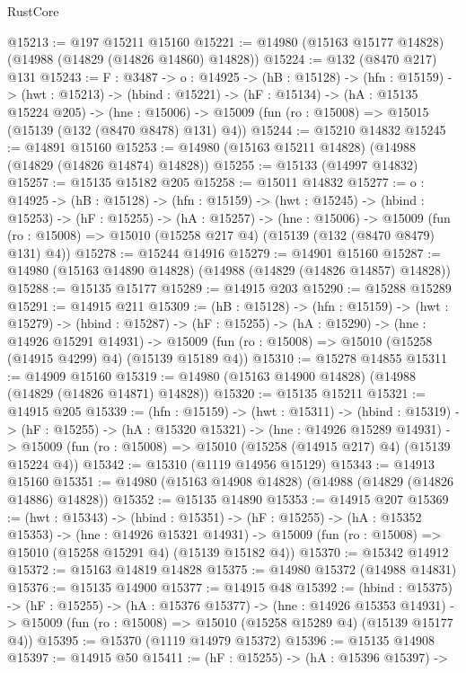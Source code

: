 \begin{lexlean}{RustCore}
\begin{coremodule}
@15213 := @197 @15211 @15160
@15221 := @14980 (@15163 @15177 @14828) (@14988 (@14829 (@14826 @14860) @14828))
@15224 := @132 (@8470 @217) @131
@15243 := {F : @3487} ->
  {o : @14925} ->
  (hB : @15128) ->
  (hfn : @15159) ->
  (hwt : @15213) ->
  (hbind : @15221) ->
  (hF : @15134) ->
  (hA : @15135 @15224 @205) ->
  (hne : @15006) -> @15009 (fun (ro : @15008) => @15015 (@15139 (@132 (@8470 @8478) @131) @4))
@15244 := @15210 @14832
@15245 := @14891 @15160
@15253 := @14980 (@15163 @15211 @14828) (@14988 (@14829 (@14826 @14874) @14828))
@15255 := @15133 (@14997 @14832)
@15257 := @15135 @15182 @205
@15258 := @15011 @14832
@15277 := {o : @14925} ->
  (hB : @15128) ->
  (hfn : @15159) ->
  (hwt : @15245) ->
  (hbind : @15253) ->
  (hF : @15255) ->
  (hA : @15257) ->
  (hne : @15006) ->
  @15009 (fun (ro : @15008) => @15010 (@15258 @217 @4) (@15139 (@132 (@8470 @8479) @131) @4))
@15278 := @15244 @14916
@15279 := @14901 @15160
@15287 := @14980 (@15163 @14890 @14828) (@14988 (@14829 (@14826 @14857) @14828))
@15288 := @15135 @15177
@15289 := @14915 @203
@15290 := @15288 @15289
@15291 := @14915 @211
@15309 := (hB : @15128) ->
  (hfn : @15159) ->
  (hwt : @15279) ->
  (hbind : @15287) ->
  (hF : @15255) ->
  (hA : @15290) ->
  (hne : @14926 @15291 @14931) ->
  @15009 (fun (ro : @15008) => @15010 (@15258 (@14915 @4299) @4) (@15139 @15189 @4))
@15310 := @15278 @14855
@15311 := @14909 @15160
@15319 := @14980 (@15163 @14900 @14828) (@14988 (@14829 (@14826 @14871) @14828))
@15320 := @15135 @15211
@15321 := @14915 @205
@15339 := (hfn : @15159) ->
  (hwt : @15311) ->
  (hbind : @15319) ->
  (hF : @15255) ->
  (hA : @15320 @15321) ->
  (hne : @14926 @15289 @14931) ->
  @15009 (fun (ro : @15008) => @15010 (@15258 (@14915 @217) @4) (@15139 @15224 @4))
@15342 := @15310 (@1119 @14956 @15129)
@15343 := @14913 @15160
@15351 := @14980 (@15163 @14908 @14828) (@14988 (@14829 (@14826 @14886) @14828))
@15352 := @15135 @14890
@15353 := @14915 @207
@15369 := (hwt : @15343) ->
  (hbind : @15351) ->
  (hF : @15255) ->
  (hA : @15352 @15353) ->
  (hne : @14926 @15321 @14931) ->
  @15009 (fun (ro : @15008) => @15010 (@15258 @15291 @4) (@15139 @15182 @4))
@15370 := @15342 @14912
@15372 := @15163 @14819 @14828
@15375 := @14980 @15372 (@14988 @14831)
@15376 := @15135 @14900
@15377 := @14915 @48
@15392 := (hbind : @15375) ->
  (hF : @15255) ->
  (hA : @15376 @15377) ->
  (hne : @14926 @15353 @14931) ->
  @15009 (fun (ro : @15008) => @15010 (@15258 @15289 @4) (@15139 @15177 @4))
@15395 := @15370 (@1119 @14979 @15372)
@15396 := @15135 @14908
@15397 := @14915 @50
@15411 := (hF : @15255) ->
  (hA : @15396 @15397) ->

\end{coremodule}
\end{lexlean}

